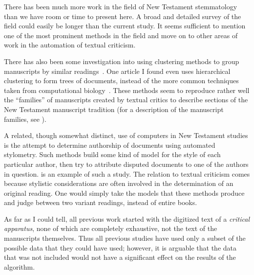 \documentclass[onecolumn, 12pt]{article}
\begin{document}
There has been much more work in the field of New Testament stemmatology than
we have room or time to present here.  A broad and detailed survey of the field
could easily be longer than the current study.  It seems sufficient to
mention one of the most prominent methods in the field and move on to other
areas of work in the automation of textual criticism.

There has also been some investigation into using clustering methods to group
manuscripts by similar readings~\cite{willker-pca-of-manuscripts-of-john}.  One
article I found even uses hierarchical clustering to form trees of documents,
instead of the more common techniques taken from computational
biology~\cite{thorpe-2002-statistical-manuscript-classification}.  These
methods seem to reproduce rather well the ``families'' of manuscripts created
by textual critics to describe sections of the New Testament manuscript
tradition (for a description of the manuscript families, see \cite[pp.
212--218]{metzger-1992-text-of-the-new-testament}).

A related, though somewhat distinct, use of computers in New Testament studies
is the attempt to determine authorship of documents using automated stylometry.
Such methods build some kind of model for the style of each particular author,
then try to attribute disputed documents to one of the authors in question.
\cite{alviar-2008-computational-linguistics-and-biblical-studies} is an example
of such a study.  The relation to textual criticism comes because stylistic
considerations are often involved in the determination of an original reading.
One would simply take the models that these methods produce and judge between
two variant readings, instead of entire books.

As far as I could tell, all previous work started with the digitized text of a
\emph{critical apparatus}, none of which are completely exhaustive, not the
text of the manuscripts themselves.  Thus all previous studies have used only a
subset of the possible data that they could have used; however, it is arguable
that the data that was not included would not have a significant effect on the
results of the algorithm.
\end{document}
